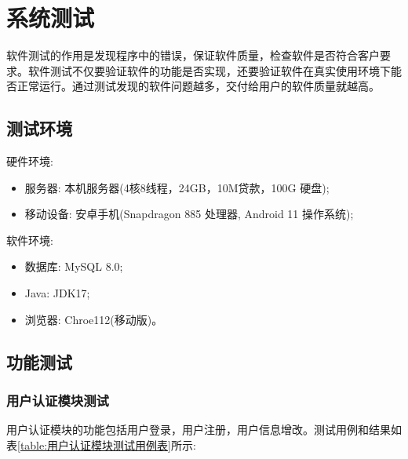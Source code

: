 \section{系统测试}

软件测试的作用是发现程序中的错误，保证软件质量，检查软件是否符合客户要求。软件测试不仅要验证软件的功能是否实现，还要验证软件在真实使用环境下能否正常运行。通过测试发现的软件问题越多，交付给用户的软件质量就越高\cite{朱少民2005软件测试方法和技术}。

\subsection{测试环境}

硬件环境:
\begin{itemize}
  \item 服务器: 本机服务器(4核8线程，24GB，10M贷款，100G 硬盘);
  \item 移动设备: 安卓手机(Snapdragon 885 处理器, Android 11 操作系统);
\end{itemize}

软件环境:
\begin{itemize}
  \item 数据库: MySQL 8.0;
  \item Java: JDK17;
  \item 浏览器: Chroe112(移动版)。
\end{itemize}

\subsection{功能测试}

\subsubsection{用户认证模块测试}

用户认证模块的功能包括用户登录，用户注册，用户信息增改。测试用例和结果如表\ref{table:用户认证模块测试用例表}所示:

